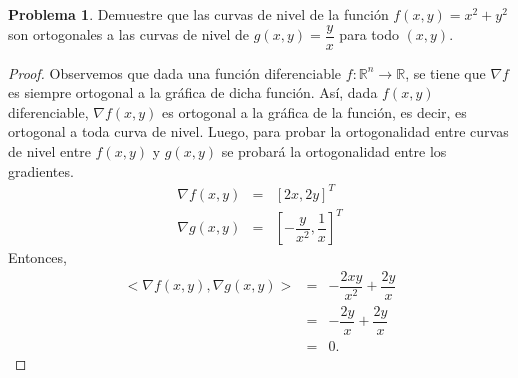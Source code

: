 \documentclass[12pt,letterpaper]{article}
\theoremstyle{definition}
\newtheorem{problm}{Problema}
\begin{document}
\begin{problm}
	Demuestre que las curvas de nivel de la función $ f(x,y) = x^2 + y^2 $ son ortogonales a las curvas de nivel de $ g(x,y) = \dfrac{y}{x} $ para todo $ (x,y) $.
	\begin{proof}
		Observemos que dada una función diferenciable  $ f: \mathbb{R}^n \to \mathbb{R} $, se tiene que $ \nabla f $ es siempre ortogonal a la gráfica de dicha función. Así, dada $ f(x,y) $ diferenciable, $ \nabla f(x,y) $ es ortogonal a la gráfica de la función, es decir, es ortogonal a toda curva de nivel. Luego, para probar la ortogonalidad entre curvas de nivel entre $ f(x,y) $ y $ g(x,y) $ se probará la ortogonalidad entre los gradientes.
		\begin{eqnarray*}
			\nabla f(x,y) & = & \left[ 2x, 2y \right]^T \\
			\nabla g(x,y) & = & \left[ -\dfrac{y}{x^2}, \dfrac{1}{x} \right]^T
		\end{eqnarray*}
		Entonces,
		\begin{eqnarray*}
			<\nabla f(x,y), \nabla g(x,y) > & = & -\dfrac{2xy}{x^2} + \dfrac{2y}{x} \\
											& = & -\dfrac{2y}{x} + \dfrac{2y}{x} \\
											& = & 0.
		\end{eqnarray*}
	\end{proof}
\end{problm}
\end{document}
